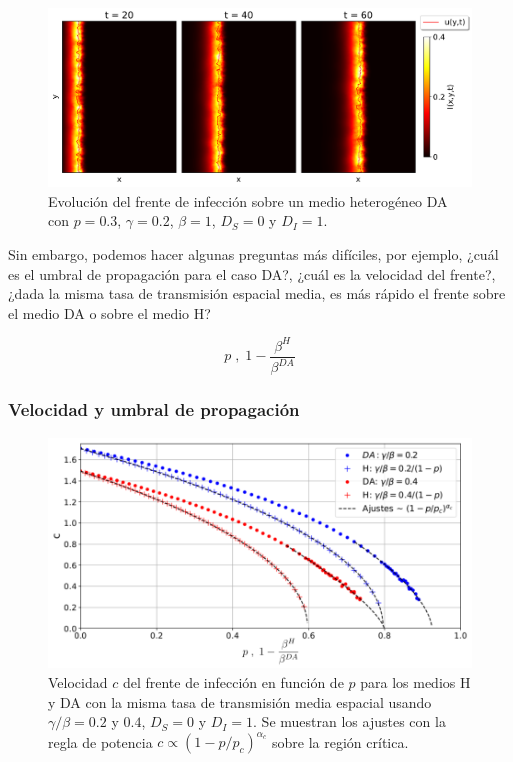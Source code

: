 \begin{figure}[b]
    \centering
    \includegraphics[width=\imsizeL]{da_case.pdf}
    \caption{Evolución del frente de infección sobre un medio heterogéneo DA con $p=0.3$, $\gamma=0.2$, $\beta=1$, $D_S = 0$ y $D_{I}=1$.}
    \label{fig:da}
\end{figure}

Sin embargo, podemos hacer algunas preguntas más difíciles, por ejemplo, ¿cuál es el umbral de propagación para el caso DA?, ¿cuál es la velocidad del frente?,
¿dada la misma tasa de transmisión espacial media, es más rápido el frente sobre el medio DA o sobre el medio H? 

\begin{equation}
    p\;,\;1 - \frac{\beta^H}{\beta ^{DA}}
\end{equation}

\subsubsection*{Velocidad y umbral de propagación}

\begin{figure}[!b]
    \centering
    \includegraphics[width=\imsizeL]{cc.png}
    \caption{Velocidad $c$ del frente de infección en función de $p$ para los medios H y DA con la misma tasa de transmisión media espacial usando $\gamma/\beta=0.2$ y $0.4$, $D_S=0$ y $D_{I}=1$. Se muestran los ajustes con la regla de potencia $c\propto(1-p/p_c)^{\alpha_c}$ sobre la región crítica.}
    \label{fig:velocidad_p}
\end{figure}

